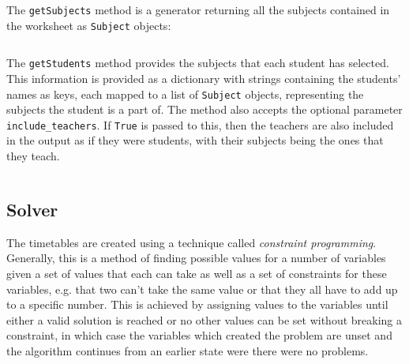 \documentclass[12pt]{article}
\newcommand{\code}[1]{\texttt{\color{Grey}#1}}
\begin{document}
The \code{getSubjects} method is a generator returning all the subjects contained in the
worksheet as \code{Subject} objects:
\vspace{-3mm}
\begin{figure}[H]
    \caption{}
    \inputminted{python}{datastore_get_subjects.py}
    \label{fig:get_subjects}
\end{figure}

The \code{getStudents} method provides the subjects that each student has selected. This
information is provided as a dictionary with strings containing the students' names as keys,
each mapped to a list of \code{Subject} objects, representing the subjects the student is a
part of. The method also accepts the optional parameter \code{include\_teachers}. If
\code{True} is passed to this, then the teachers are also included in the output as if they
were students, with their subjects being the ones that they teach.
\vspace{-3mm}
\begin{figure}[H]
    \caption{}
    \inputminted{python}{datastore_get_students.py}
    \label{fig:get_students}
\end{figure}

\subsection{Solver}

The timetables are created using a technique called \emph{constraint programming}.
Generally, this is a method of finding possible values for a number of variables given a set
of values that each can take as well as a set of constraints for these variables, e.g. that
two can't take the same value or that they all have to add up to a specific number.  This is
achieved by assigning values to the variables until either a valid solution is reached or no
other values can be set without breaking a constraint, in which case the variables which
created the problem are unset and the algorithm continues from an earlier state were there
were no problems.
\end{document}
